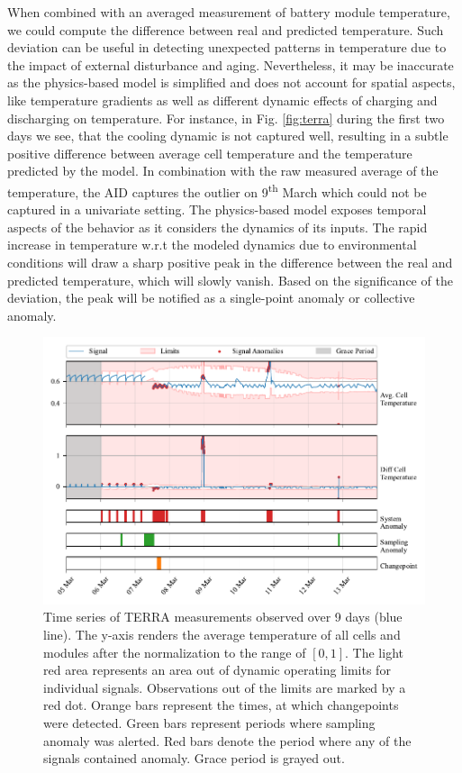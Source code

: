When combined with an averaged measurement of battery module temperature, we could compute the difference between real and predicted temperature. Such deviation can be useful in detecting unexpected patterns in temperature due to the impact of external disturbance and aging. Nevertheless, it may be inaccurate as the physics-based model is simplified and does not account for spatial aspects, like temperature gradients as well as different dynamic effects of charging and discharging on temperature. For instance, in Fig. \ref{fig:terra} during the first two days we see, that the cooling dynamic is not captured well, resulting in a subtle positive difference between average cell temperature and the temperature predicted by the model. In combination with the raw measured average of the temperature, the AID captures the outlier on 9\textsuperscript{th} March which could not be captured in a univariate setting. The physics-based model exposes temporal aspects of the behavior as it considers the dynamics of its inputs. The rapid increase in temperature w.r.t the modeled dynamics due to environmental conditions will draw a sharp positive peak in the difference between the real and predicted temperature, which will slowly vanish. Based on the significance of the deviation, the peak will be notified as a single-point anomaly or collective anomaly.

\begin{figure}[htbp]
\centerline{\includegraphics{figures/TERRA_thresh_4days.pdf}}
\caption{Time series of TERRA measurements observed over 9 days (blue line). The y-axis renders the average temperature of all cells and modules after the normalization to the range of $[0, 1]$. The light red area represents an area out of dynamic operating limits for individual signals. Observations out of the limits are marked by a red dot. Orange bars represent the times, at which changepoints were detected. Green bars represent periods where sampling anomaly was alerted. Red bars denote the period where any of the signals contained anomaly. Grace period is grayed out.}
\label{fig:terra_multi}
\end{figure}

